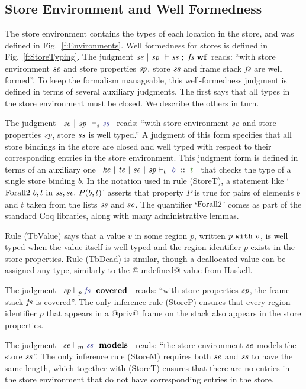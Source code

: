 

\subsection{Store Environment and Well Formedness}

The store environment contains the types of each location in the store, and was defined in Fig.~\ref{f:Environments}. Well formedness for stores is defined in Fig.~\ref{f:StoreTyping}. The judgment \mbox{$\mathit{se} ~|~ \mathit{sp} ~\vdash \mathit{ss} ~;~ \mathit{fs} ~ {\mathbf{wf}}$} reads: ``with store environment $\mathit{se}$ and store properties $\mathit{sp}$, store $\mathit{ss}$ and frame stack $\mathit{fs}$ are well formed''. To keep the formalism manageable, this well-formedness judgment is defined in terms of several auxiliary judgments. The first says that all types in the store environment must be closed. We describe the others in turn.

The judgment ~$\StoreT{\mse}{\msp}{\mss}$~ reads: ``with store environment $\mathit{se}$ and store properties $\mathit{sp}$, store $\mathit{ss}$ is well typed.'' A judgment of this form specifies that all store bindings in the store are closed and well typed with respect to their corresponding entries in the store environment. This judgment form is defined in terms of an auxiliary one ~$\TypeB{\mke}{\mte}{\mse}{\msp}{b}{t}$~ that checks the type of a single store binding $b$. In the notation used in rule (StoreT), a statement like `$\textrm{Forall2}~ b,t ~\textrm{in}~ \mathit{ss},\mathit{se}.~P(b,t)$' asserts that property $P$ is true for pairs of elements $b$ and $t$ taken from the lists $\mathit{ss}$ and $\mathit{se}$. The quantifier `$\textrm{Forall2}$' comes as part of the standard Coq libraries, along with many administrative lemmas.

Rule (TbValue) says that a value $v$ in some region $p$, written $p ~\texttt{with}~ v$, is well typed when the value itself is well typed and the region identifier $p$ exists in the store properties. Rule (TbDead) is similar, though a deallocated value can be assigned any type, similarly to the @undefined@ value from Haskell.

The judgment ~$\StoreP{\msp}{\mfs}$~ reads: ``with store properties $\mathit{sp}$, the frame stack $\mathit{fs}$ is covered''. The only inference rule (StoreP) ensures that every region identifier $p$ that appears in a @priv@ frame on the stack also appears in the store properties. 

The judgment ~$\StoreM{\mse}{\mss}$~ reads: ``the store environment $\mathit{se}$ models the store $\mathit{ss}$''. The only inference rule (StoreM) requires both $\mathit{se}$ and $\mathit{ss}$ to have the same length, which together with (StoreT) ensures that there are no entries in the store environment that do not have corresponding entries in the store.


